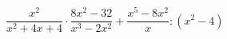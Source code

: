 \begin{ex}[type=expression]
	\begin{condition}
		\( \dfrac{x^2}{x^2+4x+4}\cdot\dfrac{8x^2-32}{x^3-2x^2}+\dfrac{x^5-8x^2}{x}:(x^2-4) \)
	\end{condition}
\end{ex}